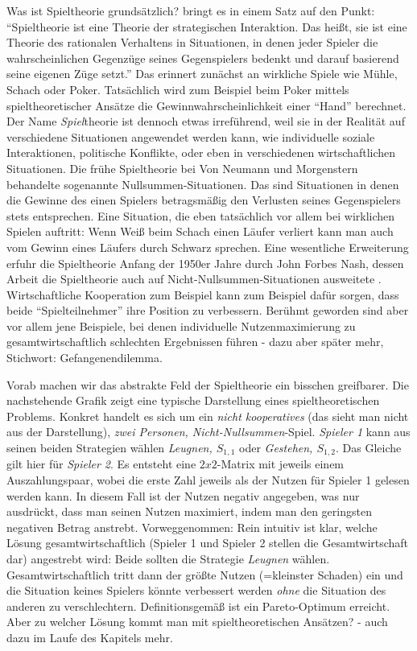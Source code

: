 Was ist Spieltheorie grundsätzlich? \textcite[S. 136]{Harsanyi1994} bringt es in einem Satz auf den Punkt: "`Spieltheorie ist eine Theorie der strategischen Interaktion. Das heißt, sie ist eine Theorie des rationalen Verhaltens in Situationen, in denen jeder Spieler die wahrscheinlichen Gegenzüge seines Gegenspielers bedenkt und darauf basierend seine eigenen Züge setzt."' Das erinnert zunächst an wirkliche Spiele wie Mühle, Schach oder Poker. Tatsächlich wird zum Beispiel beim Poker mittels spieltheoretischer Ansätze die Gewinnwahrscheinlichkeit einer "`Hand"' berechnet. Der Name \textit{Spiel}theorie ist dennoch etwas irreführend, weil sie in der Realität auf verschiedene Situationen angewendet werden kann, wie individuelle soziale Interaktionen, politische Konflikte, oder eben in verschiedenen wirtschaftlichen Situationen. Die frühe Spieltheorie bei Von Neumann und Morgenstern behandelte sogenannte Nullsummen-Situationen. Das sind Situationen in denen die Gewinne des einen Spielers betragsmäßig den Verlusten seines Gegenspielers stets entsprechen. Eine Situation, die eben tatsächlich vor allem bei wirklichen Spielen auftritt: Wenn Weiß beim Schach einen Läufer verliert kann man auch vom Gewinn eines Läufers durch Schwarz sprechen. Eine wesentliche Erweiterung erfuhr die Spieltheorie Anfang der 1950er Jahre durch John Forbes Nash, dessen Arbeit die Spieltheorie auch auf Nicht-Nullsummen-Situationen ausweitete \parencite[S. 163]{Nash1994}. Wirtschaftliche Kooperation zum Beispiel kann zum Beispiel dafür sorgen, dass beide "`Spielteilnehmer"' ihre Position zu verbessern. Berühmt geworden sind aber vor allem jene Beispiele, bei denen individuelle Nutzenmaximierung zu gesamtwirtschaftlich schlechten Ergebnissen führen - dazu aber später mehr, Stichwort: Gefangenendilemma.

Vorab machen wir das abstrakte Feld der Spieltheorie ein bisschen greifbarer. Die nachstehende Grafik zeigt eine typische Darstellung eines spieltheoretischen Problems. Konkret handelt es sich um ein \textit{nicht kooperatives} (das sieht man nicht aus der Darstellung), \textit{zwei Personen, Nicht-Nullsummen}-Spiel. \textit{Spieler 1} kann aus seinen beiden Strategien wählen \textit{Leugnen, $S_{1,1}$} oder \textit{Gestehen, $S_{1,2}$}. Das Gleiche gilt hier für \textit{Spieler 2}. Es entsteht eine $2x2$-Matrix mit jeweils einem Auszahlungspaar, wobei die erste Zahl jeweils als der Nutzen für Spieler 1 gelesen werden kann. In diesem Fall ist der Nutzen negativ angegeben, was nur ausdrückt, dass man seinen Nutzen maximiert, indem man den geringsten negativen Betrag anstrebt. Vorweggenommen: Rein intuitiv ist klar, welche Lösung gesamtwirtschaftlich (Spieler 1 und Spieler 2 stellen die Gesamtwirtschaft dar) angestrebt wird: Beide sollten die Strategie \textit{Leugnen} wählen. Gesamtwirtschaftlich tritt dann der größte Nutzen (=kleinster Schaden) ein und die Situation keines Spielers könnte verbessert werden \textit{ohne} die Situation des anderen zu verschlechtern. Definitionsgemäß ist ein Pareto-Optimum erreicht. Aber zu welcher Lösung kommt man mit spieltheoretischen Ansätzen? - auch dazu im Laufe des Kapitels mehr.



